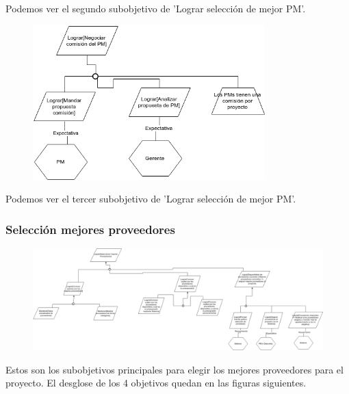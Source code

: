 Podemos ver el segundo subobjetivo de 'Lograr selección de mejor PM'.

\begin{figure}[H]
    \centering
    \includegraphics[width=0.8\textwidth]{imagenes/objetivos-seleccion-mejor-pm-3.png}
\end{figure}

Podemos ver el tercer subobjetivo de 'Lograr selección de mejor PM'.

\subsubsection{Selección mejores proveedores}

\begin{figure}[H]
    \centering
    \includegraphics[width=9in, keepaspectratio, angle=90]{imagenes/objetivos-seleccion-mejor-proveedor-principal.png}
\end{figure}

Estos son los subobjetivos principales para elegir los mejores proveedores para el proyecto. El desglose de los 4 objetivos quedan en las figuras siguientes.

